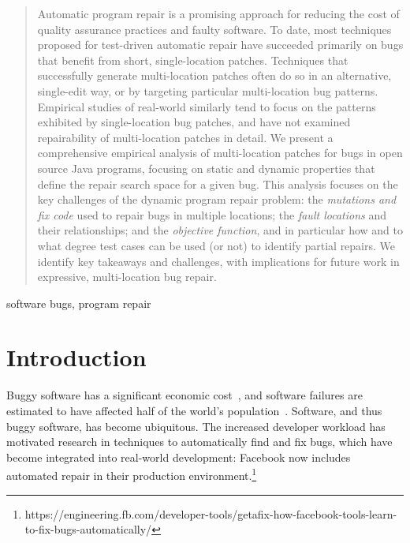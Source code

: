 \documentclass[10pt, conference]{IEEEtran}
\begin{document}
\begin{abstract}
    Automatic program repair is a promising approach for reducing the
    cost of quality assurance practices and faulty software. To date, most
    techniques proposed for test-driven automatic repair have succeeded
    primarily on bugs that benefit from short, single-location patches. Techniques
    that successfully generate multi-location patches often do so in an
    alternative, single-edit way, or by targeting particular multi-location bug
    patterns. Empirical studies of real-world similarly tend to focus on the
    patterns exhibited by single-location bug patches, and have not examined repairability
    of multi-location patches in detail. We present a comprehensive empirical analysis
    of multi-location patches for bugs in open source Java programs, focusing on static and
    dynamic properties that define the repair search space for a given bug.
    This analysis focuses on the key challenges of the dynamic program repair
    problem: the \emph{mutations and fix code} used to repair bugs in multiple locations;
    the \emph{fault locations} and their relationships; and the \emph{objective
      function}, and in particular how and to what degree test cases can be used
    (or not) to identify partial repairs. We identify key takeaways and
    challenges, with implications for future work in expressive, multi-location bug
    repair.
\end{abstract}

\begin{IEEEkeywords}
  software bugs, program repair
\end{IEEEkeywords}

\newcommand{\rqorinsight}[2]{
  \setlength{\fboxsep}{0.8em}
  \vspace{0.5em}
  \begin{center}
  \Ovalbox{\begin{minipage}{0.9\linewidth}
    \textbf{RQ#1:} #2
    \end{minipage}}
  \end{center}
  \vspace{0.5em}}

\section{Introduction}

Buggy software has a significant economic cost~\cite{cambridge-study}, and
software failures are estimated to have affected half of the world's
population~\cite{tricentis}. Software, and thus buggy software, has become
ubiquitous. The increased developer workload has motivated research in
techniques to automatically find and fix bugs, which have become integrated into
real-world development: Facebook now includes automated repair in their
production
environment.\footnote{https://engineering.fb.com/developer-tools/getafix-how-facebook-tools-learn-to-fix-bugs-automatically/}
\end{document}
